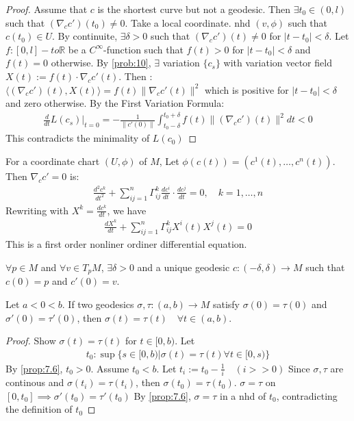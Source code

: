 \begin{proof}
    Assume that $c$ is the shortest curve but not a geodesic. Then $\exists t_0 \in (0,l)$ such that $(\nabla_c c')(t_0) \neq 0$.
    Take a local coordinate. nhd $(v, \phi)$ such that $c(t_0) \in U$.
    By continuite, $\exists \delta > 0$ such that $(\nabla_c c')(t) \neq 0$ for $|t-t_0|< \delta$.
    Let $f: [0,l] -to \mathbb{R}$ be a $C^{\infty}$-function such that $f(t)>0$ for $|t-t_0|< \delta$ and $f(t) = 0$ otherwise.
    By \autoref{prob:10}, $\exists$ variation $\{c_s\}$ with variation vector field
    $X(t) := f(t) \cdot \nabla_c c'(t)$. Then :
    $\langle (\nabla_c c')(t), X(t) \rangle = f(t) \| \nabla_c c'(t) \|^2$
    which is positive for $|t-t_0|< \delta$ and zero otherwise.
    By the First Variation Formula:
    \[
    \begin{aligned}
        \frac{d}{dt} L(c_s)|_{t=0} = - \frac{1}{\|c'(0)\|} \int_{t_0-\delta}^{t_0 + \delta} f(t) \|(\nabla_c c')(t)\|^2 dt <0
    \end{aligned}
    \]
    This contradicts the minimality of $L(c_0)$
\end{proof}
For a coordinate chart $(U, \phi)$ of $M$, Let
$\phi(c(t)) = (c^1(t), \dots, c^n(t))$. Then $\nabla_c c' = 0$ is:
\[
\begin{aligned}
    \frac{d^2c^k}{dt^2} + \sum_{ij=1}^n \Gamma_{ij}^k \frac{dc^i}{dt} \cdot \frac{dc^j}{dt} = 0, \quad k = 1, \dots, n
\end{aligned}
\]
Rewriting with $X^k = \frac{dc^k}{dt}$, we have
\[
\begin{aligned}
    \frac{d X^k}{dt} + \sum_{ij = 1}^n \Gamma_{ij}^k X^i (t) X^j (t) = 0
\end{aligned}
\]
This is a first order nonliner ordiner differential equation.

\begin{proposition}
    $\forall p \in M$ and $\forall v \in T_p M$, $\exists \delta>0$ and a unique geodesic
    $c: (-\delta, \delta) \to M$ such that $c(0) = p$ and $c'(0) = v$.
    \label{prop:7.6}
\end{proposition}

\begin{proposition}
    Let $a<0<b$. If two geodesics $\sigma, \tau : (a,b) \to M$ satisfy $\sigma(0) = \tau(0)$ and $\sigma'(0) = \tau'(0)$, then $\sigma(t) = \tau(t) \quad \forall t \in (a,b)$.
    \label{prop:7.7}
\end{proposition}

\begin{proof}
    Show $\sigma(t) = \tau(t)$ for $t \in [0,b)$.
    Let
    \[
    \begin{aligned}
        t_0 : \sup \{s \in [0,b) | \sigma(t) = \tau(t) \forall t \in [0,s)\}
    \end{aligned}
    \]
    By \autoref{prop:7.6}, $t_0>0$. Assume $t_0 <b$.
    Let $t_i := t_0 - \frac{1}{i} \quad(i >> 0)$
    Since $\sigma,\tau$ are continous and $\sigma(t_i) = \tau(t_i)$, then $\sigma(t_0) = \tau(t_0)$.
    $\sigma = \tau$ on $[0, t_0] \implies \sigma'(t_0)=\tau'(t_0)$ 
    By \autoref{prop:7.6}, $\sigma= \tau$ in a nhd of $t_0$, contradicting the definition of $t_0$
\end{proof}

